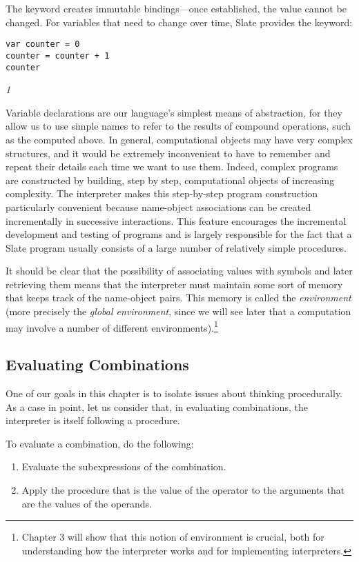 The  keyword creates immutable bindings---once established, the value cannot be changed. For variables that need to change over time, Slate provides the  keyword:

\begin{lstlisting}
var counter = 0
counter = counter + 1
counter
\end{lstlisting}
\textit{1}

Variable declarations are our language's simplest means of abstraction, for they allow us to use simple names to refer to the results of compound operations, such as the  computed above. In general, computational objects may have very complex structures, and it would be extremely inconvenient to have to remember and repeat their details each time we want to use them. Indeed, complex programs are constructed by building, step by step, computational objects of increasing complexity. The interpreter makes this step-by-step program construction particularly convenient because name-object associations can be created incrementally in successive interactions. This feature encourages the incremental development and testing of programs and is largely responsible for the fact that a Slate program usually consists of a large number of relatively simple procedures.

It should be clear that the possibility of associating values with symbols and later retrieving them means that the interpreter must maintain some sort of memory that keeps track of the name-object pairs. This memory is called the \textit{environment} (more precisely the \textit{global environment}, since we will see later that a computation may involve a number of different environments).\footnote{Chapter 3 will show that this notion of environment is crucial, both for understanding how the interpreter works and for implementing interpreters.}

\subsection{Evaluating Combinations}

One of our goals in this chapter is to isolate issues about thinking procedurally. As a case in point, let us consider that, in evaluating combinations, the interpreter is itself following a procedure.

To evaluate a combination, do the following:

\begin{enumerate}
\item Evaluate the subexpressions of the combination.
\item Apply the procedure that is the value of the operator to the arguments that are the values of the operands.
\end{enumerate}

